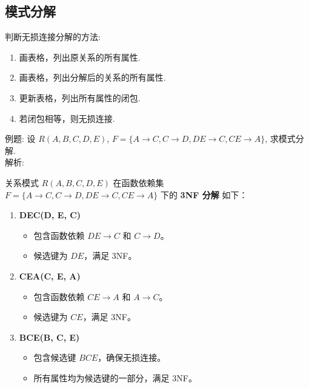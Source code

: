 \subsection{模式分解}
判断无损连接分解的方法:
\begin{enumerate}
    \item 画表格，列出原关系的所有属性.
    \item 画表格，列出分解后的关系的所有属性.
    \item 更新表格，列出所有属性的闭包.
    \item 若闭包相等，则无损连接.
\end{enumerate}
例题:
设 $R(A, B, C, D, E)$, $F = \{A \rightarrow C, C \rightarrow D, DE \rightarrow C, CE \rightarrow A\}$, 求模式分解.\\
解析:
\par 关系模式 \( R(A, B, C, D, E) \) 在函数依赖集 \( F = \{A \rightarrow C, C \rightarrow D, DE \rightarrow C, CE \rightarrow A\} \) 下的 \textbf{3NF 分解} 如下：

\begin{enumerate}
    \item \textbf{DEC(D, E, C)}
    \begin{itemize}
        \item 包含函数依赖 \( DE \rightarrow C \) 和 \( C \rightarrow D \)。
        \item 候选键为 \( DE \)，满足 3NF。
    \end{itemize}

    \item \textbf{CEA(C, E, A)}
    \begin{itemize}
        \item 包含函数依赖 \( CE \rightarrow A \) 和 \( A \rightarrow C \)。
        \item 候选键为 \( CE \)，满足 3NF。
    \end{itemize}

    \item \textbf{BCE(B, C, E)}
    \begin{itemize}
        \item 包含候选键 \( BCE \)，确保无损连接。
        \item 所有属性均为候选键的一部分，满足 3NF。
    \end{itemize}
\end{enumerate}

